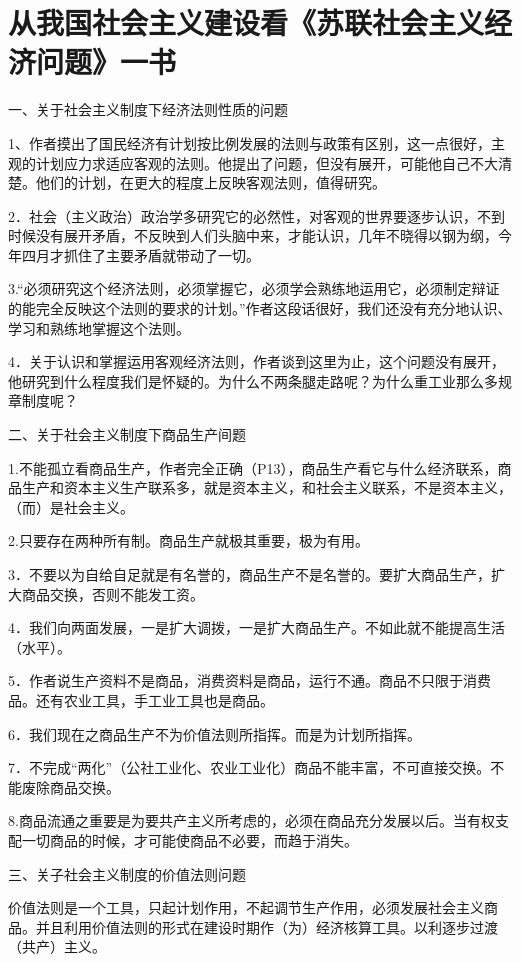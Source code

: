 \section[从我国社会主义建设看《苏联社会主义经济问题》一书（一九五八年）]{从我国社会主义建设看《苏联社会主义经济问题》一书}


一、关于社会主义制度下经济法则性质的问题

1、作者摸出了国民经济有计划按比例发展的法则与政策有区别，这一点很好，主观的计划应力求适应客观的法则。他提出了问题，但没有展开，可能他自己不大清楚。他们的计划，在更大的程度上反映客观法则，值得研究。

2．社会（主义政治）政治学多研究它的必然性，对客观的世界要逐步认识，不到时候没有展开矛盾，不反映到人们头脑中来，才能认识，几年不晓得以钢为纲，今年四月才抓住了主要矛盾就带动了一切。

3.“必须研究这个经济法则，必须掌握它，必须学会熟练地运用它，必须制定辩证的能完全反映这个法则的要求的计划。”作者这段话很好，我们还没有充分地认识、学习和熟练地掌握这个法则。

4．关于认识和掌握运用客观经济法则，作者谈到这里为止，这个问题没有展开，他研究到什么程度我们是怀疑的。为什么不两条腿走路呢？为什么重工业那么多规章制度呢？

二、关于社会主义制度下商品生产间题

1.不能孤立看商品生产，作者完全正确（P13），商品生产看它与什么经济联系，商品生产和资本主义生产联系多，就是资本主义，和社会主义联系，不是资本主义，（而）是社会主义。

2.只要存在两种所有制。商品生产就极其重要，极为有用。

3．不要以为自给自足就是有名誉的，商品生产不是名誉的。要扩大商品生产，扩大商品交换，否则不能发工资。

4．我们向两面发展，一是扩大调拨，一是扩大商品生产。不如此就不能提高生活（水平）。

5．作者说生产资料不是商品，消费资料是商品，运行不通。商品不只限于消费品。还有农业工具，手工业工具也是商品。

6．我们现在之商品生产不为价值法则所指挥。而是为计划所指挥。

7．不完成“两化”（公社工业化、农业工业化）商品不能丰富，不可直接交换。不能废除商品交换。

8.商品流通之重要是为要共产主义所考虑的，必须在商品充分发展以后。当有权支配一切商品的时候，才可能使商品不必要，而趋于消失。

三、关子社会主义制度的价值法则问题

价值法则是一个工具，只起计划作用，不起调节生产作用，必须发展社会主义商品。并且利用价值法则的形式在建设时期作（为）经济核算工具。以利逐步过渡（共产）主义。

